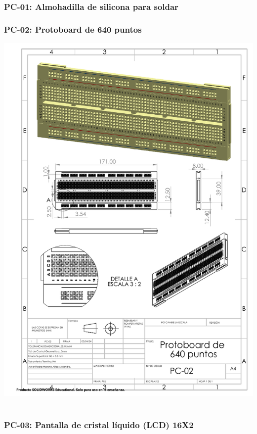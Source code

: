 \subsubsection{PC-01: Almohadilla de silicona para soldar}

\subsubsection{PC-02: Protoboard de 640 puntos}

\begin{center}

\includegraphics[width=.85\textwidth]{22/img/protoboardDibujo.PDF}~\\[15cm]
\end{center}



\subsubsection{PC-03: Pantalla de cristal líquido (LCD) 16X2}

